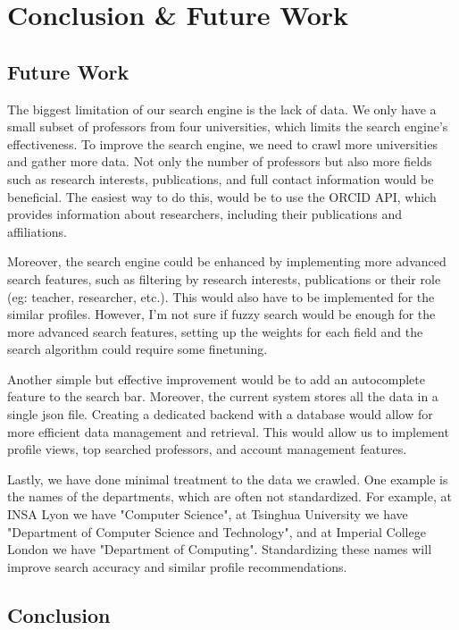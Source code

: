 \section{Conclusion \& Future Work}

\subsection{Future Work}

The biggest limitation of our search engine is the lack of data. We only have a small subset of professors from four universities, which limits the search engine's effectiveness. To improve the search engine, we need to crawl more universities and gather more data. Not only the number of professors but also more fields such as research interests, publications, and full contact information would be beneficial. The easiest way to do this, would be to use the ORCID API, which provides information about researchers, including their publications and affiliations.

Moreover, the search engine could be enhanced by implementing more advanced search features, such as filtering by research interests, publications or their role (eg: teacher, researcher, etc.). This would also have to be implemented for the similar profiles. However, I'm not sure if fuzzy search would be enough for the more advanced search features, setting up the weights for each field and the search algorithm could require some finetuning.

Another simple but effective improvement would be to add an autocomplete feature to the search bar. Moreover, the current system stores all the data in a single json file. Creating a dedicated backend with a database would allow for more efficient data management and retrieval. This would allow us to implement profile views, top searched professors, and account management features.

Lastly, we have done minimal treatment to the data we crawled. One example is the names of the departments, which are often not standardized. For example, at INSA Lyon we have "Computer Science", at Tsinghua University we have "Department of Computer Science and Technology", and at Imperial College London we have "Department of Computing". Standardizing these names will improve search accuracy and similar profile recommendations.

\subsection{Conclusion}

